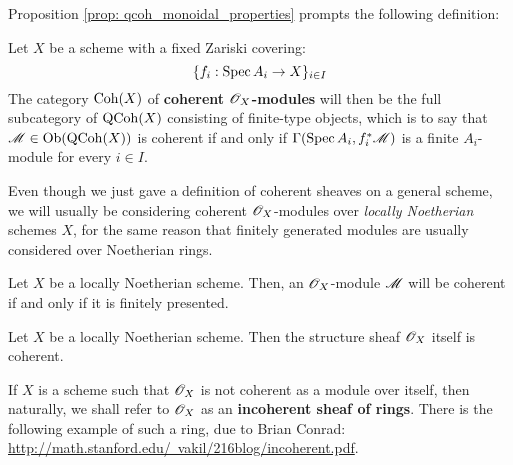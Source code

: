             Proposition \ref{prop: qcoh_monoidal_properties} prompts the following definition:
            \begin{definition} \label{def: coherent_modules}
                Let $X$ be a scheme with a fixed Zariski covering:
                    $$\{ f_i: \operatorname{Spec} A_i \to X \}_{i \in I}$$
                The category $\mathrm{Coh}(X)$ of \textbf{coherent $\mathscr{O}_X$-modules} will then be the full subcategory of $\mathrm{QCoh}(X)$ consisting of finite-type objects, which is to say that $\mathscr{M} \in \mathrm{Ob}( \mathrm{QCoh}(X) )$ is coherent if and only if $\Gamma(\operatorname{Spec} A_i, f_i^*\mathscr{M})$ is a finite $A_i$-module for every $i \in I$.
            \end{definition}
            Even though we just gave a definition of coherent sheaves on a general scheme, we will usually be considering coherent $\mathscr{O}_X$-modules over \textit{locally Noetherian} schemes $X$, for the same reason that finitely generated modules are usually considered over Noetherian rings. 
            \begin{proposition} \label{prop: coherent_modules_over_noetherian_schemes}
                Let $X$ be a locally Noetherian scheme. Then, an $\mathscr{O}_X$-module $\mathscr{M}$ will be coherent if and only if it is finitely presented.
            \end{proposition}
            \begin{example}
                Let $X$ be a locally Noetherian scheme. Then the structure sheaf $\mathscr{O}_X$ itself is coherent. 
            \end{example}
            \begin{example}
                If $X$ is a scheme such that $\mathscr{O}_X$ is not coherent as a module over itself, then naturally, we shall refer to $\mathscr{O}_X$ as an \textbf{incoherent sheaf of rings}. There is the following example of such a ring, due to Brian Conrad: \href{http://math.stanford.edu/~vakil/216blog/incoherent.pdf}{http://math.stanford.edu/~vakil/216blog/incoherent.pdf}.
            \end{example}

